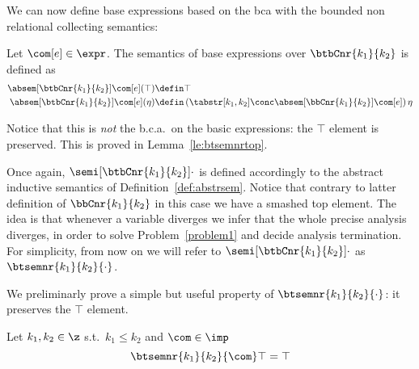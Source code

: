 We can now define base expressions based on the bca with the bounded
non relational collecting semantics:

\begin{definition}\label{def:boundedtop}
  Let \(\com[e] \in \expr\). The semantics of base expressions over
  \(\btbCnr{k_1}{k_2}\) is defined as
  \begin{align*}
    \absem[\btbCnr{k_1}{k_2}]{\com[e]}(\top) \defin & \top \\
    \absem[\btbCnr{k_1}{k_2}]{\com[e]}(\eta) \defin & \left({\tabstr[k_1,k_2]}\conc \absem[\bbCnr{k_1}{k_2}]{\com[e]}\right)\eta
  \end{align*}
\end{definition}
Notice that this is \emph{not} the b.c.a.\ on the basic expressions:
the \(\top\) element is preserved. This is proved in
Lemma~\ref{le:btsemnrtop}.

Once again, \(\semi[\btbCnr{k_1}{k_2}]{\cdot}\) is defined accordingly
to the abstract inductive semantics of Definition~\ref{def:abstrsem}.
Notice that contrary to latter definition of \(\bbCnr{k_1}{k_2}\) in
this case we have a smashed top element. The idea is that whenever a
variable diverges we infer that the whole precise analysis diverges,
in order to solve Problem~\ref{problem1} and decide analysis
termination.  For simplicity, from now on we will refer to
\(\semi[\btbCnr{k_1}{k_2}]{\cdot}\) as \(\btsemnr{k_1}{k_2}{\cdot}\).

We preliminarly prove a simple but useful property of
\(\btsemnr{k_1}{k_2}{\cdot}\): it preserves the \(\top\) element.

\begin{lemma}\label{le:btsemnrtop}
  Let \(k_1, k_2 \in \z\) s.t.\ \(k_1 \leq k_2\) and \(\com\in\imp\)
  \begin{equation*}
    \btsemnr{k_1}{k_2}{\com}\top = \top
  \end{equation*}
\end{lemma}

